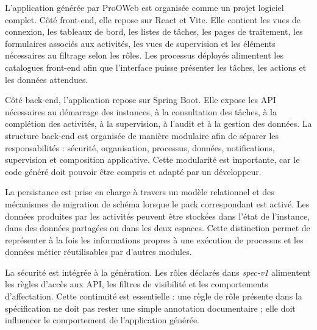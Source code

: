 L'application générée par ProOWeb est organisée comme un projet logiciel complet. Côté front-end, elle repose sur React et Vite. Elle contient les vues de connexion, les tableaux de bord, les listes de tâches, les pages de traitement, les formulaires associés aux activités, les vues de supervision et les éléments nécessaires au filtrage selon les rôles. Les processus déployés alimentent les catalogues front-end afin que l'interface puisse présenter les tâches, les actions et les données attendues.

Côté back-end, l'application repose sur Spring Boot. Elle expose les API nécessaires au démarrage des instances, à la consultation des tâches, à la complétion des activités, à la supervision, à l'audit et à la gestion des données. La structure back-end est organisée de manière modulaire afin de séparer les responsabilités : sécurité, organisation, processus, données, notifications, supervision et composition applicative. Cette modularité est importante, car le code généré doit pouvoir être compris et adapté par un développeur.

La persistance est prise en charge à travers un modèle relationnel et des mécanismes de migration de schéma lorsque le pack correspondant est activé. Les données produites par les activités peuvent être stockées dans l'état de l'instance, dans des données partagées ou dans les deux espaces. Cette distinction permet de représenter à la fois les informations propres à une exécution de processus et les données métier réutilisables par d'autres modules.

La sécurité est intégrée à la génération. Les rôles déclarés dans \textit{spec-v1} alimentent les règles d'accès aux API, les filtres de visibilité et les comportements d'affectation. Cette continuité est essentielle : une règle de rôle présente dans la spécification ne doit pas rester une simple annotation documentaire ; elle doit influencer le comportement de l'application générée.

